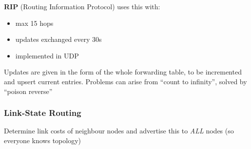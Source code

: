 \documentclass[]{article}
\theoremstyle{definition}
\begin{document}
	\textbf{RIP} (Routing Information Protocol) uses this with:
	\begin{itemize}
		\item max 15 hops
		\item updates exchanged every 30s
		\item implemented in UDP
	\end{itemize}

	Updates are given in the form of the whole forwarding table, to be incremented and upsert current entries. Problems can arise from ``count to infinity'', solved by ``poison reverse''

	\subsubsection{Link-State Routing}
	Determine link costs of neighbour nodes and advertise this to \textit{ALL} nodes (so everyone knows topology)
\end{document}
